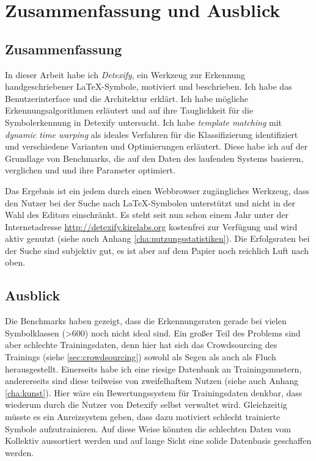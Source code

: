 \chapter{Zusammenfassung und Ausblick}
\label{cha:ausblick}

\section{Zusammenfassung}

In dieser Arbeit habe ich \emph{Detexify}, ein Werkzeug zur Erkennung handgeschriebener \LaTeX-Symbole, motiviert und beschrieben. Ich habe das Benutzerinterface und die Architektur erklärt. Ich habe mögliche Erkennungsalgorithmen erläutert und auf ihre Tauglichkeit für die Symbolerkennung in Detexify untersucht. Ich habe \emph{template matching} mit \emph{dynamic time warping} als ideales Verfahren für die Klassifizierung identifiziert und verschiedene Varianten und Optimierungen erläutert. Diese habe ich auf der Grundlage von Benchmarks, die auf den Daten des laufenden Systems basieren, verglichen und und ihre Parameter optimiert.

Das Ergebnis ist ein jedem durch einen Webbrowser zugängliches Werkzeug, dass den Nutzer bei der Suche nach \LaTeX-Symbolen unterstützt und nicht in der Wahl des Editors einschränkt. Es steht seit nun schon einem Jahr unter der Internetadresse \url{http://detexify.kirelabs.org} kostenfrei zur Verfügung und wird aktiv genutzt (siehe auch Anhang \ref{cha:nutzungsstatistiken}). Die Erfolgsraten bei der Suche sind subjektiv gut, es ist aber auf dem Papier noch reichlich Luft nach oben.

\section{Ausblick}

Die Benchmarks haben gezeigt, dass die Erkennungsraten gerade bei vielen Symbolklassen (>600) noch nicht ideal sind. Ein großer Teil des Problems sind aber schlechte Trainingsdaten, denn hier hat sich das Crowdsourcing des Trainings (siehe \ref{sec:crowdsourcing}) sowohl als Segen als auch als Fluch herausgestellt. Einerseits habe ich eine riesige Datenbank an Trainingsmustern, andererseits sind diese teilweise von zweifelhaftem Nutzen (siehe auch Anhang \ref{cha:kunst}). Hier wäre ein Bewertungssystem für Trainingsdaten denkbar, dass wiederum durch die Nutzer von Detexify selbst verwaltet wird. Gleichzeitig müsste es ein Anreizsystem geben, dass dazu motiviert schlecht trainierte Symbole aufzutrainieren. Auf diese Weise könnten die schlechten Daten vom Kollektiv aussortiert werden und auf lange Sicht eine solide Datenbasis geschaffen werden.

